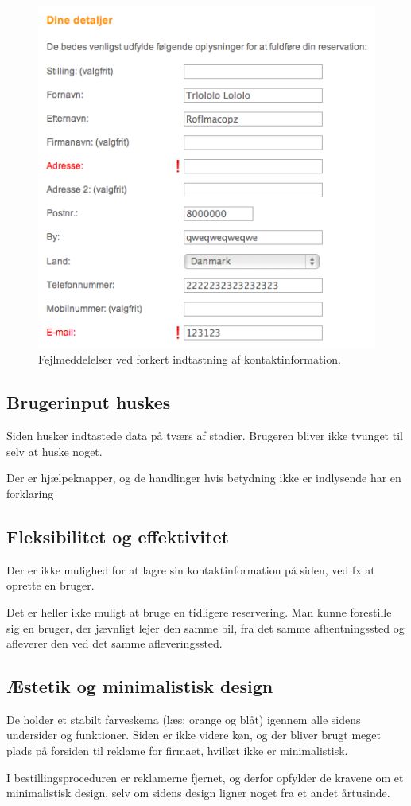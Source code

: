 \documentclass[a4paper]{article}
\begin{document}
\begin{figure}[htbp]
  \begin{center}
    \includegraphics{8.png}
  \end{center}
  \caption{Fejlmeddelelser ved forkert indtastning af kontaktinformation.}
  \label{fejl_kontaktinformation}
\end{figure}

\subsection{Brugerinput huskes}
Siden husker indtastede data på tværs af stadier. Brugeren bliver ikke tvunget
til selv at huske noget.

Der er hjælpeknapper, og de handlinger hvis betydning ikke er indlysende har en
forklaring

\subsection{Fleksibilitet og effektivitet}
Der er ikke mulighed for at lagre sin kontaktinformation på siden, ved fx at
oprette en bruger.

Det er heller ikke muligt at bruge en tidligere reservering. Man kunne
forestille sig en bruger, der jævnligt lejer den samme bil, fra det samme
afhentningssted og afleverer den ved det samme afleveringssted.

\subsection{Æstetik og minimalistisk design}
De holder et stabilt farveskema (læs: orange og blåt) igennem alle sidens
undersider og funktioner. Siden er ikke videre køn, og der bliver brugt meget
plads på forsiden til reklame for firmaet, hvilket ikke er minimalistisk.

I bestillingsproceduren er reklamerne fjernet, og derfor opfylder de kravene om
et minimalistisk design, selv om sidens design ligner noget fra et andet
årtusinde.
\end{document}
